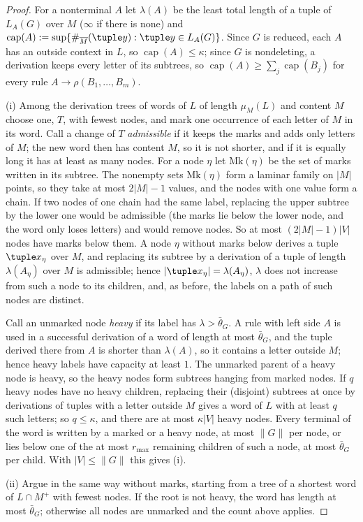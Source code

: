 \begin{proof}
For a nonterminal $A$ let $\lambda(A)$ be the least total length of a tuple of
$L_A(G)$ over $M$ ($\infty$ if there is none) and
$\operatorname{cap}(A):=\sup\{\#_{\overline M}(\tuple y):\tuple y\in L_A(G)\}$.  Since
$G$ is reduced, each $A$ has an outside context in $L$, so
$\operatorname{cap}(A)\le\kappa$; since $G$ is nondeleting, a derivation keeps every
letter of its subtrees, so $\operatorname{cap}(A)\ge\sum_j\operatorname{cap}(B_j)$ for
every rule $A\to\rho(B_1,\ldots,B_m)$.

(i) Among the derivation trees of words of $L$ of length $\mu_M(L)$ and content
$M$ choose one, $T$, with fewest nodes, and mark one occurrence of each letter of
$M$ in its word.  Call a change of $T$ \emph{admissible} if it keeps the marks and
adds only letters of $M$; the new word then has content $M$, so it is not
shorter, and if it is equally long it has at least as many nodes.  For a node
$\eta$ let $\mathrm{Mk}(\eta)$ be the set of marks written in its subtree.  The
nonempty sets $\mathrm{Mk}(\eta)$ form a laminar family on $|M|$ points, so they
take at most $2|M|-1$ values, and the nodes with one value form a chain.  If
two nodes of one chain had the same label, replacing the upper subtree by the
lower one would be admissible (the marks lie below the lower node, and the word
only loses letters) and would remove nodes.  So at most $(2|M|-1)|V|$ nodes have
marks below them.  A node $\eta$ without marks below derives a tuple
$\tuple x_\eta$ over $M$, and replacing its subtree by a derivation of a tuple of
length $\lambda(A_\eta)$ over $M$ is admissible; hence
$|\tuple x_\eta|=\lambda(A_\eta)$, $\lambda$ does not increase from such a node to
its children, and, as before, the labels on a path of such nodes are distinct.

Call an unmarked node \emph{heavy} if its label has $\lambda>\bar\theta_G$.  A rule
with left side $A$ is used in a successful derivation of a word of length at
most $\bar\theta_G$, and the tuple derived there from $A$ is shorter than
$\lambda(A)$, so it contains a letter outside $M$; hence heavy labels have
capacity at least $1$.  The unmarked parent of a heavy node is heavy, so the
heavy nodes form subtrees hanging from marked nodes.  If $q$ heavy nodes have no
heavy children, replacing their (disjoint) subtrees at once by derivations of
tuples with a letter outside $M$ gives a word of $L$ with at least $q$ such
letters; so $q\le\kappa$, and there are at most $\kappa|V|$ heavy nodes.  Every
terminal of the word is written by a marked or a heavy node, at most $\|G\|$ per
node, or lies below one of the at most $r_{\max}$ remaining children of such a
node, at most $\bar\theta_G$ per child.  With $|V|\le\|G\|$ this gives (i).

(ii) Argue in the same way without marks, starting from a tree of a shortest
word of $L\cap M^+$ with fewest nodes.  If the root is not heavy, the word has
length at most $\bar\theta_G$; otherwise all nodes are unmarked and the count
above applies.
\end{proof}

